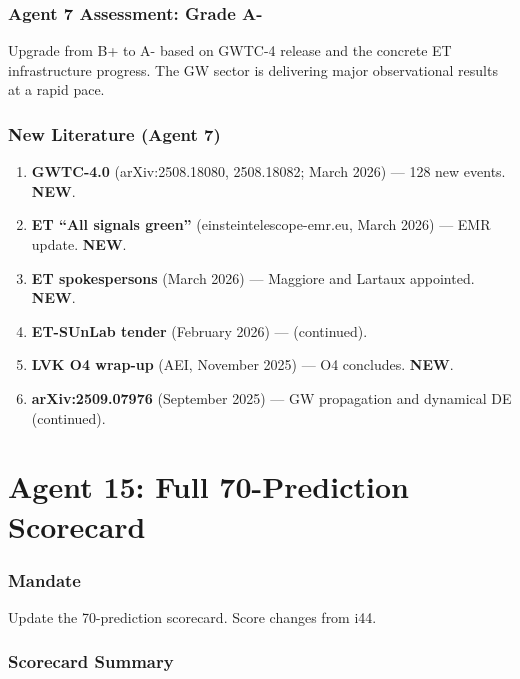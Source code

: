 \documentclass[11pt,a4paper]{article}
\newcommand{\NEW}{\textcolor{dfdblue}{\textbf{NEW}}}
\begin{document}
\section{Agent 7 Assessment: Grade A-}

Upgrade from B+ to A- based on GWTC-4 release and the concrete ET infrastructure progress. The GW sector is delivering major observational results at a rapid pace.

\section{New Literature (Agent 7)}

\begin{enumerate}
\item \textbf{GWTC-4.0} (arXiv:2508.18080, 2508.18082; March 2026) --- 128 new events. \NEW.
\item \textbf{ET ``All signals green''} (einsteintelescope-emr.eu, March 2026) --- EMR update. \NEW.
\item \textbf{ET spokespersons} (March 2026) --- Maggiore and Lartaux appointed. \NEW.
\item \textbf{ET-SUnLab tender} (February 2026) --- (continued).
\item \textbf{LVK O4 wrap-up} (AEI, November 2025) --- O4 concludes. \NEW.
\item \textbf{arXiv:2509.07976} (September 2025) --- GW propagation and dynamical DE (continued).
\end{enumerate}


\part{Agent 15: Full 70-Prediction Scorecard}
\label{part:agent15}

\section{Mandate}

Update the 70-prediction scorecard. Score changes from i44.

\section{Scorecard Summary}
\end{document}
